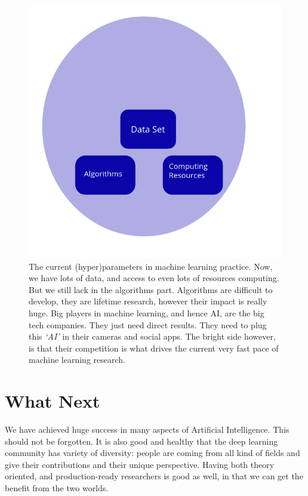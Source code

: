\documentclass[]{article}
\begin{document}
\begin{figure}
  \centering
  \label{fig:space-ml}
  \includegraphics[scale=0.3]{image}
  \caption{The current (hyper)parameters in machine learning practice. Now, we
    have lots of data, and access to even lots of resources computing. But we
    still lack in the algorithms part. Algorithms are difficult to develop, they
  are lifetime research, however their impact is really huge. Big players in
  machine learning, and hence AI, are the big tech companies. They just need
  direct results. They need to plug this \textit{`AI'} in their cameras and social
  apps. The bright side however, is that their competition is what drives the
  current very fast pace of machine learning research.}
\end{figure}

\section{What Next}
We have achieved huge success in many aspects of Artificial Intelligence. This
should not be forgotten. It is also good and
healthy that the deep learning community has variety of diversity: people are coming
from all kind of fields and give their contributions and their unique
perspective. Having both theory oriented, and production-ready researchers
is good as well, in that we can get the benefit from the two worlds.\\
\end{document}
